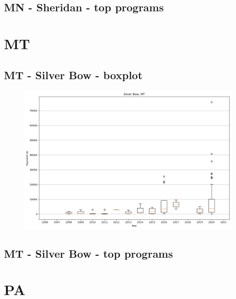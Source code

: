 \subsection*{MN - Sheridan - top programs}

\newpage
\section*{MT}
\subsection*{MT - Silver Bow - boxplot}
\begin{figure}[h]
\centering
\includegraphics[width=7in]{../output/boxplots/counties/Silver Bow-MT_boxplot.png}
\end{figure}


\subsection*{MT - Silver Bow - top programs}

\newpage
\section*{PA}
